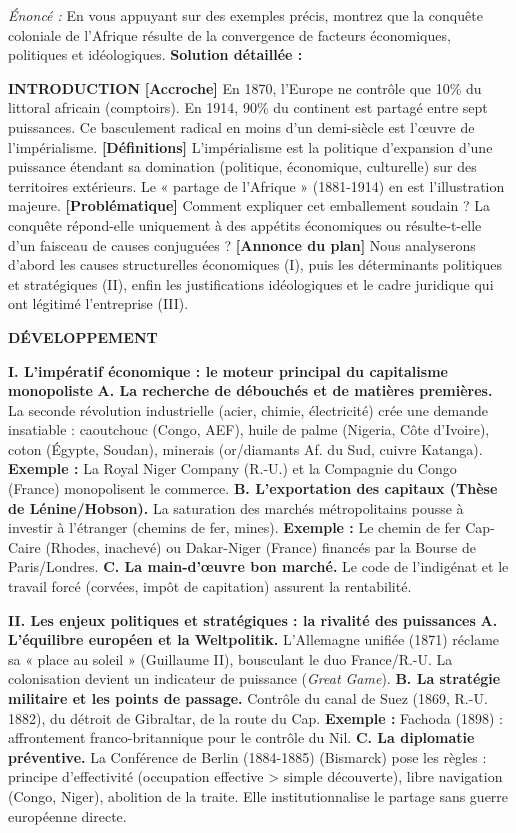 \documentclass[11pt]{article}
\newcommand{\cle}[1]{{\popxbold\color{popdark}#1}}
\begin{document}
\begin{exoresolu}
\emph{Énoncé :} En vous appuyant sur des exemples précis, montrez que la conquête coloniale de l'Afrique résulte de la convergence de facteurs économiques, politiques et idéologiques.
\tcblower
\textbf{Solution détaillée :}

\textbf{INTRODUCTION}
\textbf{[Accroche]} En 1870, l'Europe ne contrôle que 10\% du littoral africain (comptoirs). En 1914, 90\% du continent est partagé entre sept puissances. Ce basculement radical en moins d'un demi-siècle est l'œuvre de l'\cle{impérialisme}.
\textbf{[Définitions]} L'impérialisme est la politique d'expansion d'une puissance étendant sa domination (politique, économique, culturelle) sur des territoires extérieurs. Le « partage de l'Afrique » (1881-1914) en est l'illustration majeure.
\textbf{[Problématique]} Comment expliquer cet emballement soudain ? La conquête répond-elle uniquement à des appétits économiques ou résulte-t-elle d'un faisceau de causes conjuguées ?
\textbf{[Annonce du plan]} Nous analyserons d'abord les causes structurelles économiques (I), puis les déterminants politiques et stratégiques (II), enfin les justifications idéologiques et le cadre juridique qui ont légitimé l'entreprise (III).

\textbf{DÉVELOPPEMENT}

\textbf{I. L'impératif économique : le moteur principal du capitalisme monopoliste}
\textbf{A. La recherche de débouchés et de matières premières.} La seconde révolution industrielle (acier, chimie, électricité) crée une demande insatiable : caoutchouc (Congo, AEF), huile de palme (Nigeria, Côte d'Ivoire), coton (Égypte, Soudan), minerais (or/diamants Af. du Sud, cuivre Katanga). \textbf{Exemple :} La \cle{Royal Niger Company} (R.-U.) et la \cle{Compagnie du Congo} (France) monopolisent le commerce.
\textbf{B. L'exportation des capitaux (Thèse de Lénine/Hobson).} La saturation des marchés métropolitains pousse à investir à l'étranger (chemins de fer, mines). \textbf{Exemple :} Le chemin de fer \cle{Cap-Caire} (Rhodes, inachevé) ou \cle{Dakar-Niger} (France) financés par la Bourse de Paris/Londres.
\textbf{C. La main-d'œuvre bon marché.} Le code de l'indigénat et le travail forcé (corvées, impôt de capitation) assurent la rentabilité.

\textbf{II. Les enjeux politiques et stratégiques : la rivalité des puissances}
\textbf{A. L'équilibre européen et la \cle{Weltpolitik}.} L'Allemagne unifiée (1871) réclame sa « place au soleil » (Guillaume II), bousculant le duo France/R.-U. La colonisation devient un indicateur de puissance (\emph{Great Game}).
\textbf{B. La stratégie militaire et les points de passage.} Contrôle du \cle{canal de Suez} (1869, R.-U. 1882), du \cle{détroit de Gibraltar}, de la \cle{route du Cap}. \textbf{Exemple :} Fachoda (1898) : affrontement franco-britannique pour le contrôle du Nil.
\textbf{C. La diplomatie préventive.} La \cle{Conférence de Berlin (1884-1885)} (Bismarck) pose les règles : \cle{principe d'effectivité} (occupation effective > simple découverte), libre navigation (Congo, Niger), abolition de la traite. Elle institutionnalise le partage sans guerre européenne directe.


\end{exoresolu}
\end{document}
